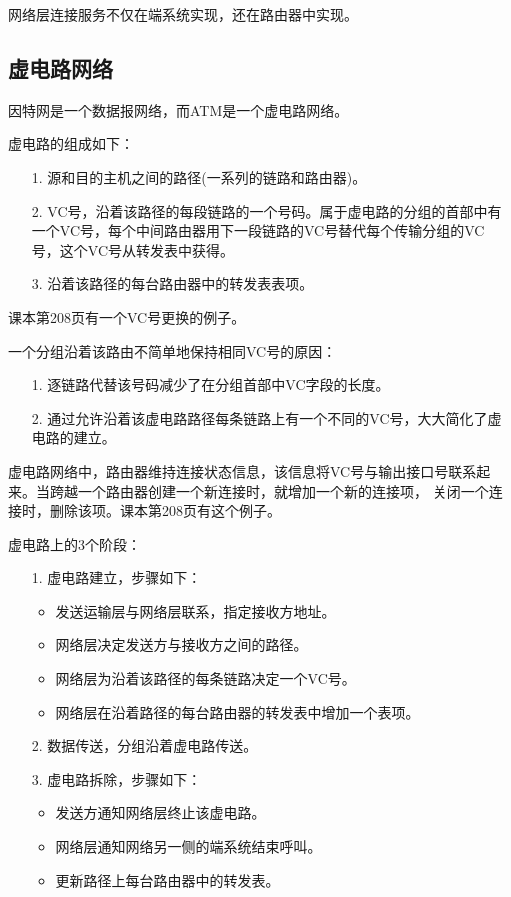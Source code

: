 \documentclass[a4paper,left=2.5cm,right=2.5cm,11pt]{article}
\begin{document}
	网络层连接服务不仅在端系统实现，还在路由器中实现。

\subsection{虚电路网络}
	因特网是一个数据报网络，而ATM是一个虚电路网络。\par

	虚电路的组成如下：
	\begin{itemize}
		\item[1.] 源和目的主机之间的路径(一系列的链路和路由器)。
		\item[2.] VC号，沿着该路径的每段链路的一个号码。属于虚电路的分组的首部中有一个VC号，每个中间路由器用下一段链路的VC号替代每个传输分组的VC号，这个VC号从转发表中获得。
		\item[3.] 沿着该路径的每台路由器中的转发表表项。
	\end{itemize}

	课本第208页有一个VC号更换的例子。\par

	一个分组沿着该路由不简单地保持相同VC号的原因：
	\begin{itemize}
		\item[1.] 逐链路代替该号码减少了在分组首部中VC字段的长度。
		\item[2.] 通过允许沿着该虚电路路径每条链路上有一个不同的VC号，大大简化了虚电路的建立。
	\end{itemize}

	虚电路网络中，路由器维持连接状态信息，该信息将VC号与输出接口号联系起来。当跨越一个路由器创建一个新连接时，就增加一个新的连接项，
	关闭一个连接时，删除该项。课本第208页有这个例子。\par

	虚电路上的3个阶段：
	\begin{itemize}
		\item[1.] 虚电路建立，步骤如下：
			\begin{itemize}
				\item 发送运输层与网络层联系，指定接收方地址。
				\item 网络层决定发送方与接收方之间的路径。
				\item 网络层为沿着该路径的每条链路决定一个VC号。
				\item 网络层在沿着路径的每台路由器的转发表中增加一个表项。
			\end{itemize}

		\item[2.] 数据传送，分组沿着虚电路传送。
		\item[3.] 虚电路拆除，步骤如下：
			\begin{itemize}
				\item 发送方通知网络层终止该虚电路。
				\item 网络层通知网络另一侧的端系统结束呼叫。
				\item 更新路径上每台路由器中的转发表。
			\end{itemize}
	\end{itemize}
\end{document}
